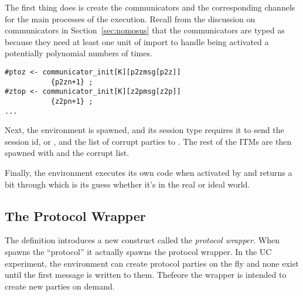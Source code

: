 The first thing  does is create the communicators and the corresponding channels for the main processes of the execution. 
Recall from the discussion on communicators in Section~\ref{sec:nomosus} that the communicators are typed as  because they need at least one unit of import to handle being activated a potentially polynomial numbers of times.
\begin{lstlisting}[basicstyle=\small\BeraMonottFamily, frame=single, mathescape]
#ptoz <- communicator_init[K][p2zmsg[p2z]]
           {p2zn+1} ;
#ztop <- communicator_init[K][z2pmsg[z2p]]
           {z2pn+1} ;
...
\end{lstlisting}
Next, the environment  is spawned, and its session type requires it to send the session id, or , and the list of corrupt parties to .
The rest of the ITMs are then spawned with  and the corrupt list.

Finally, the environment executes its own code when activated by  and returns a bit through  which is its guess whether it's in the real or ideal world.

\subsection{The Protocol Wrapper}
The  definition introduces a new construct called the \textit{protocol wrapper}. 
When  spawns the ``protocol'' it actually spawns the protocol wrapper.
In the UC experiment, the environment can create protocol parties on the fly and none exist until the first message is written to them.
Thefeore the wrapper is intended to create new parties on demand.


